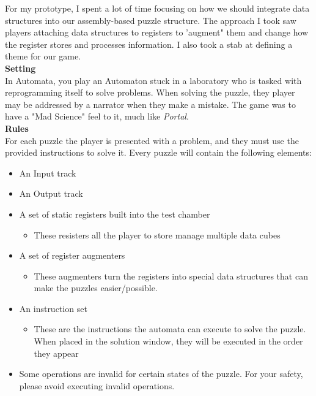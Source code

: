 For my prototype, I spent a lot of time focusing on how we should integrate data structures into our assembly-based
puzzle structure. The approach I took saw players attaching data structures to registers to 'augment" them and
change how the register stores and processes information. I also took a stab at defining a theme for our game.\\

\textbf{Setting}\\
In Automata, you play an Automaton stuck in a laboratory who is tasked with reprogramming itself to solve problems.
When solving the puzzle, they player may be addressed by a narrator when they make a mistake. The game was to have 
a "Mad Science" feel to it, much like \textit{Portal}.\\

\textbf{Rules}\\
For each puzzle the player is presented with a problem, and they must use the provided instructions to solve it. 
Every puzzle will contain the following elements:

\begin{itemize}
    \item An Input track
    \item An Output track
    \item A set of static registers built into the test chamber
    \begin{itemize}
        \item These resisters all the player to store manage multiple data cubes
    \end{itemize}
    \item A set of register augmenters
    \begin{itemize}
        \item These augmenters turn the registers into special data structures that can make the puzzles easier/possible.
    \end{itemize}
    \item An instruction set
    \begin{itemize}
        \item These are the instructions the automata can execute to solve the puzzle. When placed in the solution window,
        they will be executed in the order they appear
    \end{itemize}
    \item Some operations are invalid for certain states of the puzzle. For your safety, please avoid executing invalid operations.
\end{itemize}

